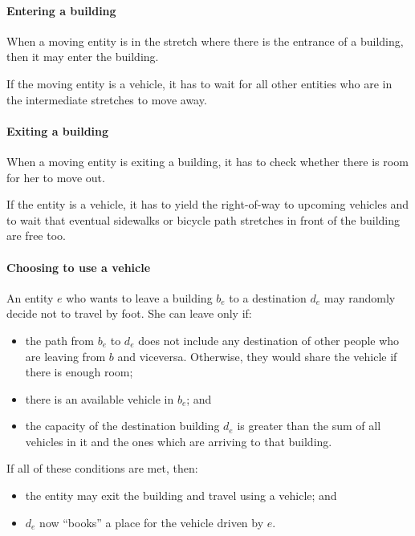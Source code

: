 \paragraph{Entering a building} When a moving entity is in the stretch where
there is the entrance of a building, then it may enter the building.

If the moving entity is a vehicle, it has to wait for all other entities who
are in the intermediate stretches to move away.

\paragraph{Exiting a building} When a moving entity is exiting a building, it
has to check whether there is room for her to move out.

If the entity is a vehicle, it has to yield the right-of-way to upcoming
vehicles and to wait that eventual sidewalks or bicycle path stretches in front
of the building are free too.

\paragraph{Choosing to use a vehicle} An entity $e$ who wants to leave a
building $b_e$ to a destination $d_e$ may randomly decide not to travel by
foot. She can leave only if:

\begin{itemize}
  \item the path from $b_e$ to $d_e$ does not include any destination of other
    people who are leaving from $b$ and viceversa. Otherwise, they would share
    the vehicle if there is enough room;
  \item there is an available vehicle in $b_e$; and
  \item the capacity of the destination building $d_e$ is greater than the sum
    of all vehicles in it and the ones which are arriving to that building.
\end{itemize}

If all of these conditions are met, then:
\begin{itemize}
  \item the entity may exit the building and travel using a vehicle; and
  \item $d_e$ now ``books'' a place for the vehicle driven by $e$.
\end{itemize}

